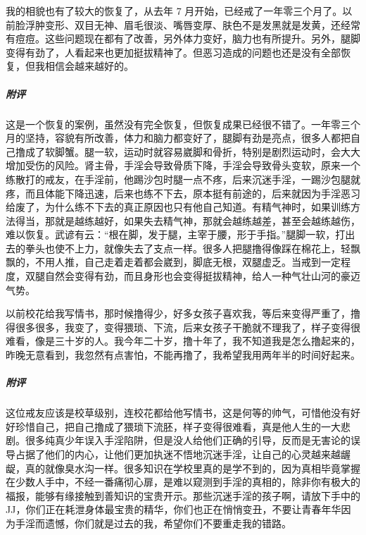 \begin{case}
    我的相貌也有了较大的恢复了，从去年 7 月开始，已经戒了一年零三个月了。以前脸浮肿变形、双目无神、眉毛很淡、嘴唇变厚、肤色不是发黑就是发黄，还经常有痘痘。这些问题现在都有了改善，另外体力变好，脑力也有所提升。另外，腿脚变得有劲了，人看起来也更加挺拔精神了。但恶习造成的问题也还是没有全部恢复，但我相信会越来越好的。
    \subparagraph{附评} 这是一个恢复的案例，虽然没有完全恢复，但恢复成果已经很不错了。一年零三个月的坚持，容貌有所改善，体力和脑力都变好了，腿脚有劲是亮点，很多人都把自己撸成了软脚蟹。腿一软，运动时就容易崴脚和骨折，特别是剧烈运动时，会大大增加受伤的风险。肾主骨，手淫会导致骨质下降，手淫会导致骨头变软，原来一个练散打的戒友，在手淫前，他踢沙包时腿一点不疼，后来沉迷手淫，一踢沙包腿就疼，而且体能下降迅速，后来也练不下去，原本挺有前途的，后来就因为手淫恶习给废了，为什么练不下去的真正原因也只有他自己知道。有精气神时，如果训练方法得当，那就是越练越好，如果失去精气神，那就会越练越差，甚至会越练越伤，难以恢复。武谚有云：“根在脚，发于腿，主宰于腰，形于手指。”腿脚一软，打出去的拳头也使不上力，就像失去了支点一样。很多人把腿撸得像踩在棉花上，轻飘飘的，不用人推，自己走着走着都会崴到，脚底无根，双腿虚乏。当戒到一定程度，双腿自然会变得有劲，而且身形也会变得挺拔精神，给人一种气壮山河的豪迈气势。
\end{case}

\begin{case}
    以前校花给我写情书，那时候撸得少，好多女孩子喜欢我，等后来变得严重了，撸得很多很多，我变了，变得猥琐、下流，后来女孩子干脆就不理我了，样子变得很难看，像是三十岁的人。我今年二十岁，撸十年了，我不知道我是怎么撸起来的，昨晚无意看到，我忽然有点害怕，不能再撸了，我希望我用两年半的时间好起来。
    \subparagraph{附评} 这位戒友应该是校草级别，连校花都给他写情书，这是何等的帅气，可惜他没有好好珍惜自己，把自己撸成了猥琐下流胚，样子变得很难看，真是他人生的一大悲剧。很多纯真少年误入手淫陷阱，但是没人给他们正确的引导，反而是无害论的误导占据了他们的内心，让他们更加执迷不悟地沉迷手淫，让自己的心灵越来越龌龊，真的就像臭水沟一样。很多知识在学校里真的是学不到的，因为真相毕竟掌握在少数人手中，不经一番痛彻心扉，是难以窥测到手淫的真相的，除非你有极大的福报，能够有缘接触到善知识的宝贵开示。那些沉迷手淫的孩子啊，请放下手中的 JJ，你们正在耗泄身体最宝贵的精华，你们也正在悄悄变丑，不要让青春年华因为手淫而遗憾，你们就是过去的我，希望你们不要重走我的错路。
\end{case}

